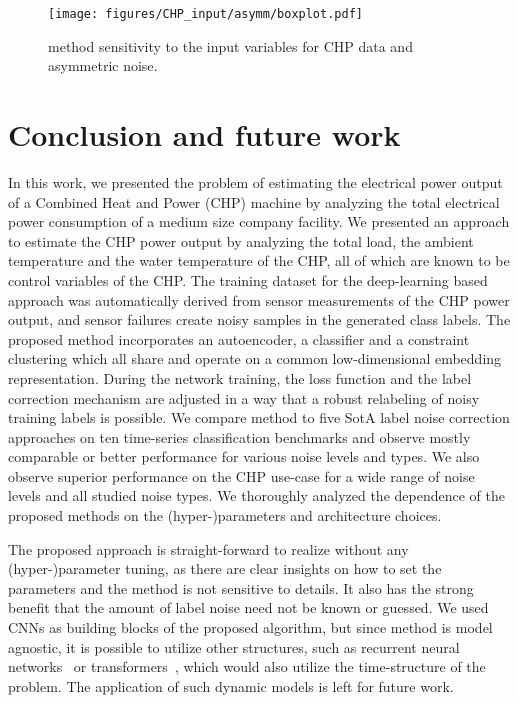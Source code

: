\documentclass[runningheads, envcountsame, a4paper]{llncs}
\begin{document}
\begin{figure}[tb!]
    \centering
    \texttt{[image: figures/CHP\_input/asymm/boxplot.pdf]}
    \caption{\acrshort{method} sensitivity to the  input variables for CHP data and asymmetric noise.}
    \label{fig:CHP_input}
\end{figure}



\section{Conclusion and future work}
In this work, we presented the problem of estimating the electrical power output of a Combined Heat and Power (CHP) machine by analyzing the total electrical power consumption of a medium size company facility. We presented an approach to estimate the CHP power output by analyzing the total load, the ambient temperature and the water temperature of the CHP, all of which are known to be control variables of the CHP. 
The training dataset for the deep-learning based approach was automatically derived from sensor measurements of the CHP power output, and sensor failures create noisy samples in the generated class labels. 
The proposed \acrfull{method} incorporates an autoencoder,  a classifier and a constraint clustering which all share and operate on a common low-dimensional embedding representation. 
During the network training, the loss function and the label correction mechanism are adjusted in a way that a robust relabeling of noisy training labels is possible.  
We compare  \acrshort{method} to five SotA label noise correction approaches on ten  time-series classification benchmarks and observe mostly comparable or better performance for various noise levels and types. 
We also observe superior performance on the CHP use-case for a wide range of noise levels and all studied noise types.
We thoroughly analyzed the dependence of the proposed methods on the (hyper-)parameters and architecture choices. 

The proposed approach is straight-forward to realize without any (hyper-)parameter tuning, as there are clear insights on how to set the parameters and the method is not sensitive to details. It also has the strong benefit that the amount of label noise need not be known or guessed. 
We used CNNs as building blocks of the proposed algorithm, but since \acrshort{method} is model agnostic, it is possible to utilize other structures, such as recurrent neural networks~\cite{Karim2018LSTMFC} or transformers~\cite{Wu2020DeepTM}, which would also utilize the time-structure of the problem. The application of such dynamic models is left for future work.
\end{document}
